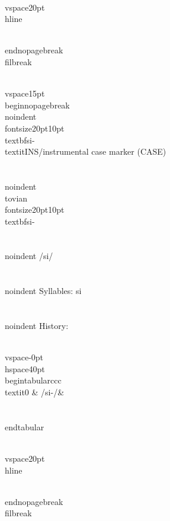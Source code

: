 \\vspace{20pt}\\hline

\\end{nopagebreak}
\\filbreak



\\vspace{15pt}
\\begin{nopagebreak}
\\noindent{\\fontsize{20pt}{10pt}\\textbf{si-} } \\textit{INS/instrumental case marker} (CASE)\\\\
\\noindent {\\tovian \\fontsize{20pt}{10pt} \\textbf{si-} }\\\\
\\noindent /s{\textprimstress}i/\\\\
\\noindent Syllables: si\\\\


\\noindent History:

\\vspace{-0pt}
\\hspace{40pt}
\\begin{tabular}{ccc}
\\textit{0} & /si-/& \\\\
\\end{tabular}

\\vspace{20pt}\\hline

\\end{nopagebreak}
\\filbreak



